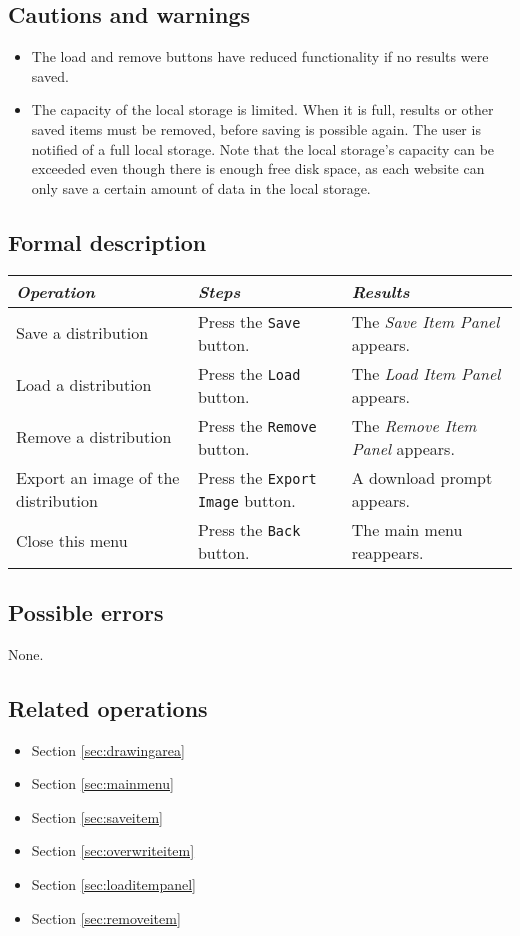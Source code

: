   \subsection*{Cautions and warnings}
  \begin{itemize}
    \item The load and remove buttons have reduced functionality if no results were saved.
    \item The capacity of the local storage is limited. When it is full, results or other saved \projectname{} items must be removed, before saving is possible again. The user is notified of a full local storage. Note that the local storage's capacity can be exceeded even though there is enough free disk space, as each website can only save a certain amount of data in the local storage.
  \end{itemize}
  
  \subsection*{Formal description}
  \begin{tabularx}{\textwidth}{XXX}
    \toprule
    \emph{Operation} & \emph{Steps} & \emph{Results} \\
    \midrule
    Save a distribution & Press the \texttt{Save} button. & The \emph{Save Item Panel} appears. \\
    \midrule
    Load a distribution & Press the \texttt{Load} button. & The \emph{Load Item Panel} appears. \\
    \midrule
    Remove a distribution & Press the \texttt{Remove} button. & The \emph{Remove Item Panel} appears. \\
    \midrule
    Export an image of the distribution & Press the \texttt{Export Image} button. & A download prompt appears. \\
    \midrule
    Close this menu & Press the \texttt{Back} button. & The main menu reappears.
    \bottomrule
  \end{tabularx}

  \subsection*{Possible errors}
  None.

  \subsection*{Related operations}
  \begin{itemize}
  \item Section \ref{sec:drawingarea}
    \item Section \ref{sec:mainmenu}
    \item Section \ref{sec:saveitem}
    \item Section \ref{sec:overwriteitem}
    \item Section \ref{sec:loaditempanel}
    \item Section \ref{sec:removeitem}
  \end{itemize}

